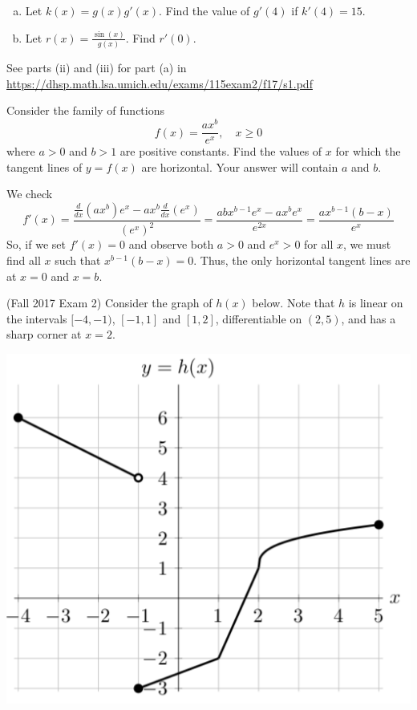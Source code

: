 \documentclass[11pt]{exam}
\newcommand{\ddx}{\frac{d}{dx}}
\begin{document}
\begin{questions}
\begin{figure}[h]
	\end{figure}	
	\begin{enumerate}[(a)]
		\item Let $k(x) = g(x)g'(x)$. Find the value of $g'(4)$ if $k'(4)=15$.
		\item Let $r(x) = \frac{\sin(x)}{g(x)}$. Find $r'(0)$.
	\end{enumerate}
        \begin{solution}
          See parts (ii) and (iii) for part (a) in\\ \href{https://dhsp.math.lsa.umich.edu/exams/115exam2/f17/s1.pdf}{https://dhsp.math.lsa.umich.edu/exams/115exam2/f17/s1.pdf}
        \end{solution}
\question Consider the family of functions
\[
f(x) = \frac{ax^b}{e^x}, \quad x \geqslant 0
\]
where $a>0$ and $b>1$ are positive constants. Find the values of $x$ for which the tangent lines of $y = f(x)$ are horizontal. Your answer will contain $a$ and $b$.
\begin{solution}
  We check \[
    f'(x) = \frac{\ddx(ax^b)e^x-ax^b\ddx(e^x)}{(e^x)^2} =
    \frac{abx^{b-1}e^x-ax^be^x}{e^{2x}} = \frac{ax^{b-1}(b-x)}{e^x}
  \]
  So, if we set \(f'(x) = 0\) and observe both \(a>0\) and \(e^x > 0\)
  for all \(x\), we must find all \(x\) such that \(x^{b-1}(b-x) = 0\). Thus,
  the only horizontal tangent lines are at \(x=0\) and \(x=b\).
\end{solution}
\question (Fall 2017 Exam 2) Consider the graph of $h(x)$ below. Note that \(h\) is linear on the intervals $[-4,-1)$, $[-1,1]$ and $[1,2]$, differentiable on $(2, 5)$, and has a sharp corner at $x = 2$.
\begin{center}
  \includegraphics[scale=0.33]{Exam2Fall2017Problem4}

\end{center}
\end{questions}
\end{document}
